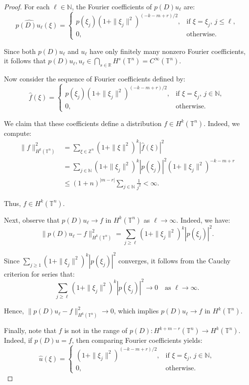 \documentclass[10pt,a4paper]{amsart}
\begin{document}
\begin{proof}
	For each $ \ell \in \mathbb{N} $, the Fourier coefficients of $ p(D)u_\ell $ are:
	\[
	\widehat{p(D)u_\ell}(\xi) =
	\begin{cases}
		p(\xi_j)(1 + \|\xi_j\|^2)^{(-k - m + r)/2}, & \text{if } \xi = \xi_j, \, j \leq \ell, \\
		0, & \text{otherwise.}
	\end{cases}
	\]
	
	Since both $ p(D)u_\ell $ and $ u_\ell $ have only finitely many nonzero Fourier coefficients, it follows that $ p(D)u_\ell, u_\ell \in \bigcap_{s \in \mathbb{R}} H^s(\mathbb{T}^n) = C^\infty(\mathbb{T}^n) $.
	
	Now consider the sequence of Fourier coefficients defined by:
	\[
	\widehat{f}(\xi) =
	\begin{cases}
		p(\xi_j)(1 + \|\xi_j\|^2)^{(-k - m + r)/2}, & \text{if } \xi = \xi_j, \, j \in \mathbb{N}, \\
		0, & \text{otherwise.}
	\end{cases}
	\]
	
	We claim that these coefficients define a distribution $ f \in H^k(\mathbb{T}^n) $. Indeed, we compute:
	\begin{align*}
		\|f\|_{H^k(\mathbb{T}^n)}^2 &= \sum_{\xi \in \mathbb{Z}^n} (1 + \|\xi\|^2)^k |\widehat{f}(\xi)|^2 \\
		&= \sum_{j \in \mathbb{N}} (1 + \|\xi_j\|^2)^k |p(\xi_j)|^2 (1 + \|\xi_j\|^2)^{-k - m + r} \\
		&\leq (1 + n)^{|m - r|} \sum_{j \in \mathbb{N}} \frac{1}{j^2} < \infty.
	\end{align*}
	
	Thus, $ f \in H^k(\mathbb{T}^n) $.
	
	\smallskip
	Next, observe that $ p(D)u_\ell \to f $ in $ H^k(\mathbb{T}^n) $ as $ \ell \to \infty $. Indeed, we have:
	\[
	\|p(D)u_\ell - f\|_{H^k(\mathbb{T}^n)}^2 = \sum_{j \geq \ell} (1 + \|\xi_j\|^2)^k |p(\xi_j)|^2.
	\]
	
	Since $ \sum_{j \geq 1} (1 + \|\xi_j\|^2)^k |p(\xi_j)|^2 $ converges, it follows from the Cauchy criterion for series that:
	\[
	\sum_{j \geq \ell} (1 + \|\xi_j\|^2)^k |p(\xi_j)|^2 \to 0 \quad \text{as } \ell \to \infty.
	\]
	
	Hence, $ \|p(D)u_\ell - f\|_{H^k(\mathbb{T}^n)}^2 \to 0 $, which implies $ p(D)u_\ell \to f $ in $ H^k(\mathbb{T}^n) $.
	
	Finally, note that $ f $ is not in the range of $ p(D): H^{k + m - r}(\mathbb{T}^n) \to H^k(\mathbb{T}^n) $. Indeed, if $ p(D)u = f $, then comparing Fourier coefficients yields:
	\[
	\widehat{u}(\xi) =
	\begin{cases}
		(1 + \|\xi_j\|^2)^{(-k - m + r)/2}, & \text{if } \xi = \xi_j, \, j \in \mathbb{N}, \\
		0, & \text{otherwise.}
	\end{cases}
	\]
	

\end{proof}
\end{document}
